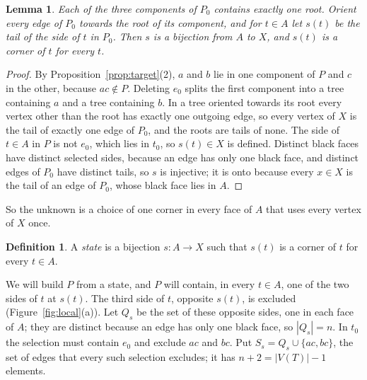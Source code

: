 \documentclass[10pt]{amsart}
\numberwithin{equation}{section}
\newtheorem{lemma}[equation]{Lemma}
\theoremstyle{definition}
\newtheorem{definition}[equation]{Definition}
\theoremstyle{remark}
\newcommand{\T}{T}
\begin{document}
\begin{lemma}\label{lem:selections-give-states}
Each of the three components of $P_0$ contains exactly one root.
Orient every edge of $P_0$ towards the root of its component, and for $t\in A$ let $s(t)$ be the tail of the side of $t$ in $P_0$.
Then $s$ is a bijection from $A$ to $X$, and $s(t)$ is a corner of $t$ for every $t$.
\end{lemma}

\begin{proof}
By Proposition~\ref{prop:target}(2), $a$ and $b$ lie in one component of $P$ and $c$ in the other, because $ac\notin P$.
Deleting $e_0$ splits the first component into a tree containing $a$ and a tree containing $b$.
In a tree oriented towards its root every vertex other than the root has exactly one outgoing edge, so every vertex of $X$ is the tail of exactly one edge of $P_0$, and the roots are tails of none.
The side of $t\in A$ in $P$ is not $e_0$, which lies in $t_0$, so $s(t)\in X$ is defined.
Distinct black faces have distinct selected sides, because an edge has only one black face, and distinct edges of $P_0$ have distinct tails, so $s$ is injective; it is onto because every $x\in X$ is the tail of an edge of $P_0$, whose black face lies in $A$.
\end{proof}

So the unknown is a choice of one corner in every face of $A$ that uses every vertex of $X$ once.

\begin{definition}
A \emph{state} is a bijection $s\colon A\to X$ such that $s(t)$ is a corner of $t$ for every $t\in A$.
\end{definition}

We will build $P$ from a state, and $P$ will contain, in every $t\in A$, one of the two sides of $t$ at $s(t)$.
The third side of $t$, opposite $s(t)$, is excluded (Figure~\ref{fig:local}(a)).
Let $Q_s$ be the set of these opposite sides, one in each face of $A$; they are distinct because an edge has only one black face, so $|Q_s|=n$.
In $t_0$ the selection must contain $e_0$ and exclude $ac$ and $bc$.
Put $S_s=Q_s\cup\{ac,bc\}$, the set of edges that every such selection excludes; it has $n+2=|V(\T)|-1$ elements.
\end{document}
